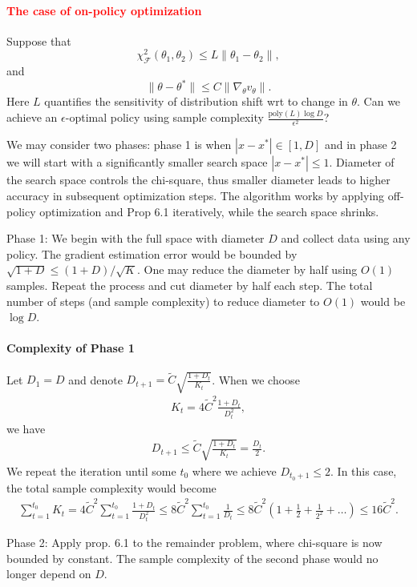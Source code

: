 \documentclass{article}
\numberwithin{equation}{section}
\begin{document}
\paragraph{\textcolor{red}{The case of on-policy optimization}}

Suppose that 
$$\chi_{\mathcal{F}}^2(\theta_1,\theta_2) \leq L\|\theta_1-\theta_2\|,$$ and $$\|\theta-\theta^*\|\leq C \|\nabla_\theta v_\theta\|.$$
Here $L$ quantifies the sensitivity of distribution shift wrt to change in $\theta$.
Can we achieve an $\epsilon$-optimal policy using sample complexity $\frac{\textrm{poly}(L)\log D}{\epsilon^2}$?

We may consider two phases: phase 1 is when $|x-x^*| \in[1, D]$ and in phase 2 we will start with a significantly smaller search space $|x-x^*|\leq 1$.
Diameter of the search space controls the chi-square, thus smaller diameter leads to higher accuracy in subsequent optimization steps. The algorithm works by applying off-policy optimization and Prop 6.1 iteratively, while the search space shrinks.

Phase 1: We begin with the full space with diameter $D$ and collect data using any policy. The gradient estimation error would be bounded by $\sqrt{1+D}\leq (1+D)/\sqrt{K}$. One may reduce the diameter by half using $O(1)$ samples. Repeat the process and cut diameter by half each step. The total number of steps (and sample complexity) to reduce diameter to $O(1)$ would be $\log D$. 
\paragraph{Complexity of Phase 1} Let $D_1=D$ and denote $D_{t+1} = \tilde{C}\sqrt{\frac{1+D_t}{K_t}}$. When we choose
\begin{align*}
    K_t = 4\tilde{C}^2\frac{1+D_t}{D_t^2},
\end{align*}
we have
\begin{align*}
    D_{t+1}\leq\tilde{C}\sqrt{\frac{1+D_t}{K_t}}=\frac{D_t}{2}.
\end{align*}
We repeat the iteration until some $t_0$ where we achieve $D_{t_0+1}\leq 2$. In this case, the total sample complexity would become
\begin{align*}
    \sum_{t=1}^{t_0}K_t = 4\tilde{C}^2\sum_{t=1}^{t_0}\frac{1+D_t}{D_t^2}\leq 8\tilde{C}^2\sum_{t=1}^{t_0}\frac{1}{D_t}\leq 8\tilde{C}^2(1+\frac{1}{2}+\frac{1}{2^2}+\ldots)\leq 16\tilde{C}^2.
\end{align*}


Phase 2: Apply prop. 6.1 to the remainder problem, where chi-square is now bounded by constant. The sample complexity of the second phase would no longer depend on $D$.
\end{document}

